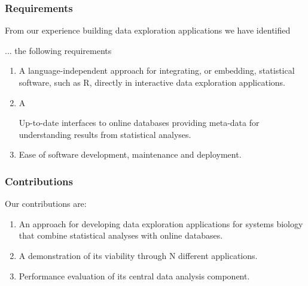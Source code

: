 

\subsubsection*{Requirements} 
From our experience building data exploration applications we have identified

... the
following requirements 

\begin{enumerate}
    \item A language-independent approach for integrating, or embedding,
        statistical software, such as R, directly in interactive data
        exploration applications.
    \item A 
        
        Up-to-date interfaces to online databases providing meta-data for
        understanding results from statistical analyses.
    \item Ease of software development, maintenance and deployment. 
\end{enumerate} 

\subsubsection*{Contributions} 
Our contributions are: 
\begin{enumerate}
\item An approach for developing data exploration applications for systems
biology that combine statistical analyses with online databases.  
\item A demonstration of its viability through N different applications. 
\item Performance evaluation of its central data analysis component. 
\end{enumerate} 

